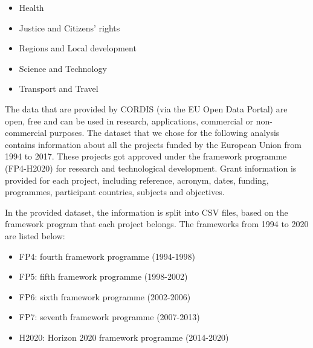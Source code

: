 \documentclass[12pt]{report}
\begin{document}
\begin{itemize}
\item Health
\item Justice and Citizens' rights
\item Regions and Local development
\item Science and Technology
\item Transport and Travel
\end{itemize}

The data that are provided by CORDIS (via the EU Open Data Portal) are
open, free and can be used in research, applications, commercial or
non-commercial purposes. The dataset that we chose for the following
analysis contains information about all the projects funded by the
European Union from 1994 to 2017. These projects got approved under
the framework programme (FP4-H2020) for research and technological
development. Grant information is provided for each project, 
including reference, acronym, dates, funding, programmes, 
participant countries, subjects and objectives.

In the provided dataset, the information is split into
CSV files, based on the framework program that each project belongs.
The frameworks from 1994 to 2020 are listed below:

\begin{itemize}
\item FP4: fourth framework programme (1994-1998)
\item FP5: fifth framework programme (1998-2002)
\item FP6: sixth framework programme (2002-2006)
\item FP7: seventh framework programme (2007-2013)
\item H2020: Horizon 2020 framework programme (2014-2020)
\end{itemize}
\end{document}
